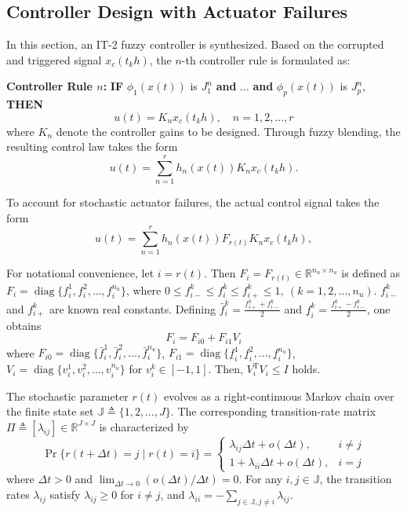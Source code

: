 \documentclass[preprint,review,fleqn,sort&compress,3p]{elsarticle}
\theoremstyle{definition} %
\theoremstyle{definition}%
\begin{document}
\subsection{Controller Design with Actuator Failures}
In this section, an IT-2 fuzzy controller is synthesized. Based on the corrupted and triggered signal $x_c(t_k h)$, the $n$-th controller rule is formulated as:

\textbf{Controller Rule $n$:} 
\textbf{IF} $\phi_1(x(t))$ is $J^{n}_1$ \textbf{and} $\dots$ \textbf{and} $\phi_p(x(t))$ is $J^{n}_p$, \textbf{THEN}
\begin{equation} 
	u(t) = K_{n} x_c(t_{k} h), \quad n = 1, 2, \ldots, r
\end{equation}
where $K_n$ denote the controller gains to be designed. Through fuzzy blending, the resulting control law takes the form
\begin{equation} 
	u(t) = \sum_{n=1}^{r} h_n(x(t)) K_{n} x_c(t_k h).
\end{equation}

To account for stochastic actuator failures, the actual control signal takes the form
\begin{equation}\label{eq:local_controller}
	u(t) = \sum_{n=1}^{r} h_n(x(t)) F_{r(t)} K_{n} x_c(t_k h),
\end{equation}

For notational convenience, let $i = r(t)$. 
Then $F_i = F_{r(t)} \in \mathbb{R}^{n_u \times n_u}$ is defined as $F_i = \operatorname{diag}\{f_{i}^1, f_{i}^2, \ldots, f_{i}^{n_u}\}$, where $0 \le f_{i-}^{k} \le f_{i}^{k} \le f_{i+}^{k} \le 1,\ (k = 1,2,\ldots,n_u)$. $f_{i-}^{k}$ and $f_{i+}^{k}$ are known real constants. 
Defining $\bar{f}_{i}^{k} = \frac{f_{i+}^{k} + f_{i-}^{k}}{2}$ and $\underline{f}_{i}^{k} = \frac{f_{i+}^{k} - f_{i-}^{k}}{2}$, one obtains
\begin{equation}\label{F_i01}
	F_{i}= F_{i0}+F_{i1} V_{i}
\end{equation}
where $F_{i0} = \operatorname{diag}\{\bar{f}_{i}^{1}, \bar{f}_{i}^{2}, \ldots, \bar{f}_{i}^{n_u}\}$, $F_{i1} = \operatorname{diag}\{\underline{f}_{i}^{1}, \underline{f}_{i}^{2}, \ldots, \underline{f}_{i}^{n_u}\}$, $V_i = \operatorname{diag}\{v_{i}^{1}, v_{i}^{2}, \ldots, v_{i}^{n_u}\}$ for $v_i^k \in [-1,1]$. Then, $V_i^\mathrm{T}V_i \le I$ holds.

The stochastic parameter $r(t)$ evolves as a right-continuous Markov chain over the finite state set $\mathbb{J} \triangleq \{1,2,\dots,J\}$. The corresponding transition-rate matrix $\Pi \triangleq [\lambda_{ij}] \in \mathbb{R}^{J \times J}$ is characterized by
\begin{equation} \label{eq:markov_jump}
	\Pr\{r(t+\Delta t) = j \mid r(t) = i\}
	=
	\begin{cases}
		\lambda_{ij}\Delta t + o(\Delta t), & i \neq j \\
		1 + \lambda_{ii}\Delta t + o(\Delta t), & i = j
	\end{cases}
\end{equation}
where $\Delta t > 0$ and $\lim_{\Delta t \to 0} (o(\Delta t) / \Delta t) = 0$. For any $i, j \in \mathbb{J}$, the transition rates $\lambda_{ij}$ satisfy $\lambda_{ij} \ge 0$ for $i \neq j$, and $\lambda_{ii} = -\sum_{j \in \mathbb{J}, j \neq i} \lambda_{ij}$.
\end{document}
